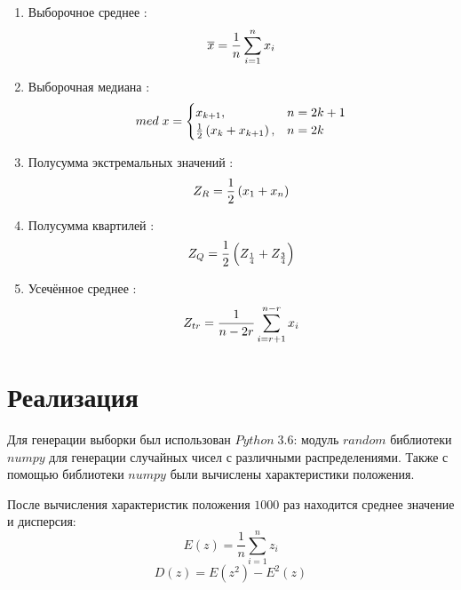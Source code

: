 \documentclass[a4]{article}
\begin{document}
\begin{enumerate}
\item Выборочное среднее \cite{average}:
\begin{equation}\label{eqn:average}
\overline{x} = \frac{1}{n}\sum_{i=1}^n x_i \hfill  
\end{equation}
\item Выборочная медиана \cite{med}:
\begin{equation}
med\; x = \begin{cases}
x_{k+1}, & n = 2k+1\\
\frac{1}{2}\left(x_k+x_{k+1}\right), & n = 2k
\end{cases} \hfill  \label{eqn:med}
\end{equation}
\item Полусумма экстремальных значений \cite{mean_extr}:
\begin{equation}
Z_R = \frac{1}{2}\left(x_1+x_n\right) \hfill  \label{eqn:mean_extr}
\end{equation}
\item Полусумма квартилей \cite{quartiles}:
\begin{equation}
Z_Q = \frac{1}{2}\left(Z_{\frac{1}{4}}+Z_{\frac{3}{4}}\right) \hfill  \label{eqn:quartiles}
\end{equation}
\item Усечённое среднее \cite{cut_mean}:
\begin{equation}
Z_{tr} = \frac{1}{n - 2r}\sum_{i=r+1}^{n-r} x_i \hfill  \label{eqn:cut_mean}
\end{equation}
\end{enumerate}

\section{Реализация}
Для генерации выборки был использован $Python\;3.6$: модуль $random$ библиотеки $numpy$ \cite{numpy} для генерации случайных чисел с различными распределениями. Также с помощью библиотеки $numpy$ были вычислены характеристики положения.

После вычисления характеристик положения $1000$ раз находится среднее значение и дисперсия: 
\begin{equation}
E(z) = \frac{1}{n}\sum_{i=1}^n z_i
\end{equation} 
\begin{equation}
D(z) = E\left(z^2\right) - E^2(z)
\end{equation}
\end{document}
